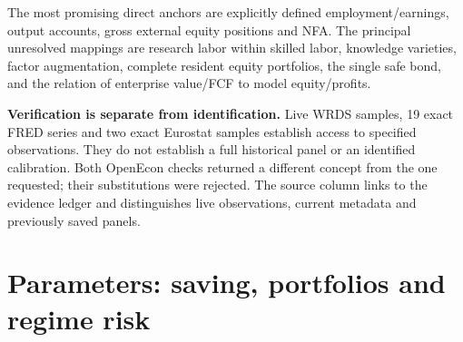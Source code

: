 \documentclass[10pt,a4paper,landscape]{article}
\begin{document}
The most promising direct anchors are explicitly defined employment/earnings, output accounts, gross external equity positions and NFA. The principal unresolved mappings are research labor within skilled labor, knowledge varieties, factor augmentation, complete resident equity portfolios, the single safe bond, and the relation of enterprise value/FCF to model equity/profits.

\textbf{Verification is separate from identification.} Live WRDS samples, 19 exact FRED series and two exact Eurostat samples establish access to specified observations. They do not establish a full historical panel or an identified calibration. Both OpenEcon checks returned a different concept from the one requested; their substitutions were rejected. The source column links to the evidence ledger and distinguishes live observations, current metadata and previously saved panels.


\clearpage\section{Parameters: saving, portfolios and regime risk}
\end{document}

